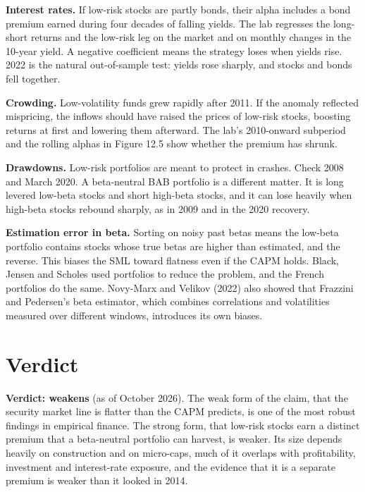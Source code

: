 \textbf{Interest rates.} If low-risk stocks are partly bonds, their alpha includes a bond premium earned during four decades of falling yields. The lab regresses the long-short returns and the low-risk leg on the market and on monthly changes in the 10-year yield. A negative coefficient means the strategy loses when yields rise. 2022 is the natural out-of-sample test: yields rose sharply, and stocks and bonds fell together.

\textbf{Crowding.} Low-volatility funds grew rapidly after 2011. If the anomaly reflected mispricing, the inflows should have raised the prices of low-risk stocks, boosting returns at first and lowering them afterward. The lab's 2010-onward subperiod and the rolling alphas in Figure 12.5 show whether the premium has shrunk.

\textbf{Drawdowns.} Low-risk portfolios are meant to protect in crashes. Check 2008 and March 2020. A beta-neutral BAB portfolio is a different matter. It is long levered low-beta stocks and short high-beta stocks, and it can lose heavily when high-beta stocks rebound sharply, as in 2009 and in the 2020 recovery.

\textbf{Estimation error in beta.} Sorting on noisy past betas means the low-beta portfolio contains stocks whose true betas are higher than estimated, and the reverse. This biases the SML toward flatness even if the CAPM holds. Black, Jensen and Scholes used portfolios to reduce the problem, and the French portfolios do the same. Novy-Marx and Velikov (2022) also showed that Frazzini and Pedersen's beta estimator, which combines correlations and volatilities measured over different windows, introduces its own biases.

\section{Verdict}
\label{sec:12-verdict}

\begin{callout}
\textbf{Verdict: weakens} (as of October 2026). The weak form of the claim, that the security market line is flatter than the CAPM predicts, is one of the most robust findings in empirical finance. The strong form, that low-risk stocks earn a distinct premium that a beta-neutral portfolio can harvest, is weaker. Its size depends heavily on construction and on micro-caps, much of it overlaps with profitability, investment and interest-rate exposure, and the evidence that it is a separate premium is weaker than it looked in 2014.
\end{callout}

